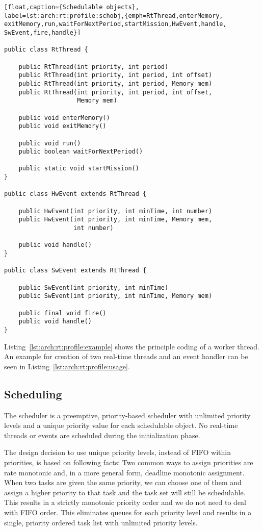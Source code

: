 \begin{lstlisting}[float,caption={Schedulable objects},
label=lst:arch:rt:profile:schobj,{emph=RtThread,enterMemory,
exitMemory,run,waitForNextPeriod,startMission,HwEvent,handle,
SwEvent,fire,handle}]

public class RtThread {

    public RtThread(int priority, int period)
    public RtThread(int priority, int period, int offset)
    public RtThread(int priority, int period, Memory mem)
    public RtThread(int priority, int period, int offset,
                    Memory mem)

    public void enterMemory()
    public void exitMemory()

    public void run()
    public boolean waitForNextPeriod()

    public static void startMission()
}

public class HwEvent extends RtThread {

    public HwEvent(int priority, int minTime, int number)
    public HwEvent(int priority, int minTime, Memory mem,
                   int number)

    public void handle()
}

public class SwEvent extends RtThread {

    public SwEvent(int priority, int minTime)
    public SwEvent(int priority, int minTime, Memory mem)

    public final void fire()
    public void handle()
}
\end{lstlisting}

Listing~\ref{lst:arch:rt:profile:example} shows the principle coding
of a worker thread. An example for creation of two real-time threads
and an event handler can be seen in
Listing~\ref{lst:arch:rt:profile:usage}.


\subsection{Scheduling}


The scheduler is a preemptive, priority-based scheduler with
unlimited priority levels and a unique priority value for each
schedulable object. No real-time threads or events are scheduled
during the initialization phase.

The design decision to use unique priority levels, instead of FIFO
within priorities, is based on following facts: Two common ways to
assign priorities are rate monotonic and, in a more general form,
deadline monotonic assignment. When two tasks are given the same
priority, we can choose one of them and assign a higher priority to
that task and the task set will still be schedulable. This results
in a strictly monotonic priority order and we do not need to deal
with FIFO order. This eliminates queues for each priority level and
results in a single, priority ordered task list with unlimited
priority levels.

